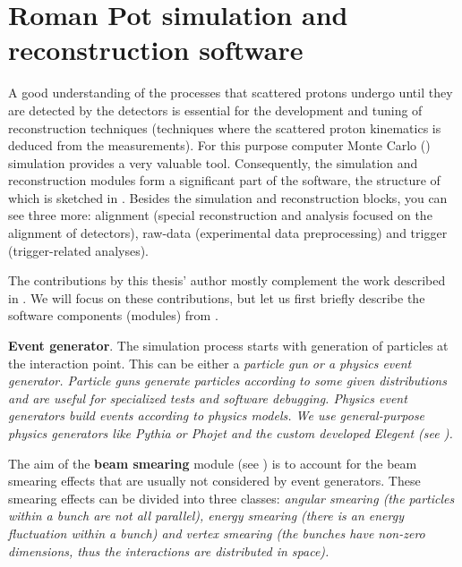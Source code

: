 \chapter[sr]{Roman Pot simulation and reconstruction software}


A good understanding of the processes that scattered protons undergo until they are detected by the  detectors is essential for the development and tuning of reconstruction techniques (techniques where the scattered proton kinematics is deduced from the  measurements). For this purpose computer Monte Carlo () simulation provides a very valuable tool. Consequently, the simulation and reconstruction modules form a significant part of the   software, the structure of which is sketched in . Besides the simulation and reconstruction blocks, you can see three more: alignment (special reconstruction and analysis focused on the alignment of  detectors), raw-data (experimental data preprocessing) and trigger (trigger-related analyses).

The contributions by this thesis' author mostly complement the work described in . We will focus on these contributions, but let us first briefly describe the software components (modules) from .

\> {\bf Event generator}.
The simulation process starts with generation of particles at the interaction point. This can be either a \em{particle gun} or a \em{physics event generator}. Particle guns generate particles according to some given distributions and are useful for specialized tests and software debugging. Physics event generators build events according to physics models. We use general-purpose physics generators like Pythia  or Phojet  and the custom developed Elegent (see ).

\> The aim of the {\bf beam smearing} module (see ) is to account for the beam smearing effects that are usually not considered by event generators. These smearing effects can be divided into three classes: \em{angular smearing} (the particles within a bunch are not all parallel), \em{energy smearing} (there is an energy fluctuation within a bunch) and \em{vertex smearing} (the bunches have non-zero dimensions, thus the interactions are distributed in space). 

